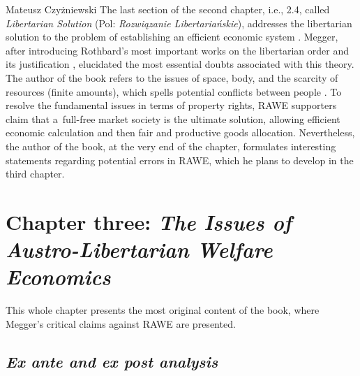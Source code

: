 \begin{newrevengenv}{Mateusz Czyżniewski}
The last section of the second chapter, i.e., 2.4, called \textit{Libertarian Solution} (Pol: \textit{Rozwiązanie Libertariańskie}), addresses the libertarian solution to the problem of establishing an efficient economic system 
\parencite[][pp.48–49]{megger_sprawiedliwosc_2021}. %
 Megger, after introducing Rothbard's most important works on the libertarian order and its justification 
\parencites[][]{rothbard_ethics_1998}[][]{rothbard_toward_2008}, %
 elucidated the most essential doubts associated with this theory. The author of the book refers to the issues of space, body, and the scarcity of resources (finite amounts), which spells potential conflicts between people 
\parencites[][]{gordon_toward_1993}[][]{herbener_pareto_1997}[][pp.311–330]{hoppe_economics_2006}[][]{wisniewski_austrian_2019}. %
 To resolve the fundamental issues in terms of property rights, RAWE supporters claim that a~full-free market society is the ultimate solution, allowing efficient economic calculation and then fair and productive goods allocation. Nevertheless, the author of the book, at the very end of the chapter, formulates interesting statements regarding potential errors in RAWE, which he plans to develop in the third chapter.



\section{Chapter three: \textit{The Issues of Austro-Libertarian Welfare Economics}}

This whole chapter 
\parencite[][pp.59–102]{megger_sprawiedliwosc_2021} %
 presents the most original content of the book, where Megger's critical claims against RAWE are presented.



\subsection{\itshape Ex ante and ex post analysis}




\end{newrevengenv}
